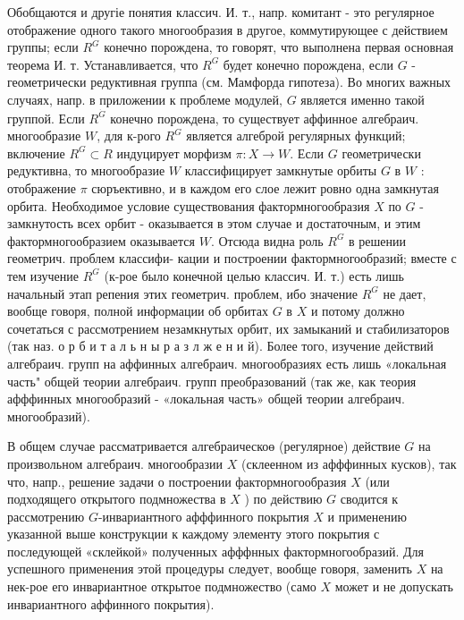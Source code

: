 \documentclass[10pt]{article}
\begin{document}
Обобщаются и другіе понятия классич. И. т., напр. комитант - это регулярное отображение одного такого многообразия в другое, коммутирующее с действием группы; если $R^{G}$ конечно порождена, то говорят, что выполнена первая основная теорема И. т. Устанавливается, что $R^{G}$ будет конечно порождена, если $G$ - геометрически редуктивная группа (см. Мамфорда гипотеза). Во многих важных случаях, напр. в приложении к проблеме модулей, $G$ является именно такой группой. Если $R^{\dot{G}}$ конечно порождена, то существует аффинное алгебраич. многообразие $W$, для к-рого $R^{G}$ является алгеброй регулярных функций; включение $R^{G} \subset R$ индуцирует морфизм $\pi: X \rightarrow W$. Если $G$ геометрически редуктивна, то многообразие $W$ классифицирует замкнутые орбиты $G$ в $W$ : отображение $\pi$ сюръективно, и в каждом его слое лежит ровно одна замкнутая орбита. Необходимое условие существования фактормногообразия $X$ по $G$ - замкнутость всех орбит - оказывается в этом случае и достаточным, и этим фактормногообразием оказывается $W$. Отсюда видна роль $R^{G}$ в решении геометрич. проблем классифи- кации и построении фактормногообразий; вместе с тем изучение $R^{G}$ (к-рое было конечной целью классич. И. т.) есть лишь начальный этап репения этих геометрич. проблем, ибо значение $R^{G}$ не дает, вообще говоря, полной информации об орбитах $G$ в $X$ и потому должно сочетаться с рассмотрением незамкнутых орбит, их замыканий и стабилизаторов (так наз. о р б и т а л ь н ы р а з л ж е н и й). Более того, изучение действий алгебраич. групп на аффинных алгебраич. многообразиях есть лишь «локальная часть" общей теории алгебраич. групп преобразований (так же, как теория афффинных многообразий - «локальная часть» общей теории алгебраич. многообразий).



В общем случае рассматривается алгебраическоө (регулярное) действие $G$ на произвольном алгебраич. многообразии $X$ (склеенном из афффинных кусков), так что, напр., решение задачи о построении фактормногообразия $X$ (или подходящего открытого подмножества в $X$ ) по действию $G$ сводится к рассмотрению $G$-инвариантного афффинного покрытия $X$ и применению указанной выше конструкции к каждому элементу этого покрытия с последующей «склейкой» полученных афффнных фактормногообразий. Для успешного применения этой процедуры следует, вообще говоря, заменить $X$ на нек-рое его инвариантное открытое подмножество (само $X$ может и не допускать инвариантного аффинного покрытия).
\end{document}
